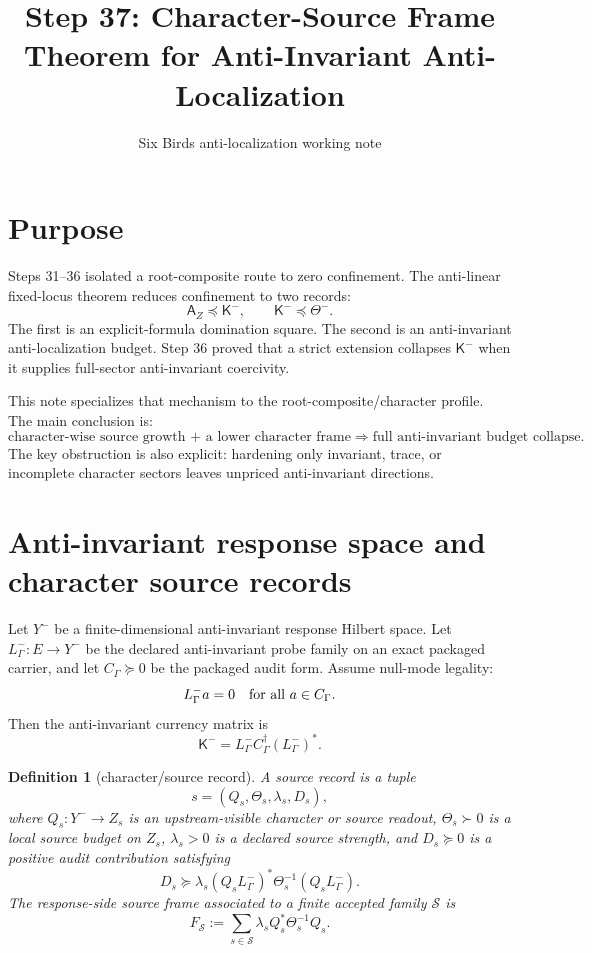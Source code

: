 \documentclass[11pt]{article}
\title{Step 37: Character-Source Frame Theorem for Anti-Invariant Anti-Localization}
\author{Six Birds anti-localization working note}
\date{}
\newtheorem{definition}{Definition}
\let\Ker\relax
\DeclareMathOperator{\Ker}{Ker}
\begin{document}
\maketitle

\section{Purpose}
Steps 31--36 isolated a root-composite route to zero confinement.  The anti-linear fixed-locus theorem reduces confinement to two records:
\[
  \mathsf A_Z\preceq \mathsf K^- ,
  \qquad
  \mathsf K^-\preceq \Theta^- .
\]
The first is an explicit-formula domination square.  The second is an anti-invariant anti-localization budget.  Step 36 proved that a strict extension collapses \(\mathsf K^-\) when it supplies full-sector anti-invariant coercivity.

This note specializes that mechanism to the root-composite/character profile.  The main conclusion is:
\[
\boxed{
\text{character-wise source growth + a lower character frame}
\Longrightarrow
\text{full anti-invariant budget collapse}.
}
\]
The key obstruction is also explicit: hardening only invariant, trace, or incomplete character sectors leaves unpriced anti-invariant directions.

\section{Anti-invariant response space and character source records}
Let \(Y^-\) be a finite-dimensional anti-invariant response Hilbert space.  Let \(L^-_\Gamma:E\to Y^-\) be the declared anti-invariant probe family on an exact packaged carrier, and let \(C_\Gamma\succeq0\) be the packaged audit form.  Assume null-mode legality:
\[
  L^-_\Gamma a=0\quad \text{for all }a\in \Ker C_\Gamma.
\]
Then the anti-invariant currency matrix is
\[
  \mathsf K^- = L^-_\Gamma C_\Gamma^\dagger (L^-_\Gamma)^* .
\]

\begin{definition}[character/source record]
A source record is a tuple
\[
  s=(Q_s,\Theta_s,\lambda_s,D_s),
\]
where \(Q_s:Y^-\to Z_s\) is an upstream-visible character or source readout, \(\Theta_s\succ0\) is a local source budget on \(Z_s\), \(\lambda_s>0\) is a declared source strength, and \(D_s\succeq0\) is a positive audit contribution satisfying
\[
  D_s\succeq
  \lambda_s (Q_sL^-_\Gamma)^*\Theta_s^{-1}(Q_sL^-_\Gamma).
\]
The response-side source frame associated to a finite accepted family \(\mathcal S\) is
\[
  F_{\mathcal S}:=
  \sum_{s\in\mathcal S}\lambda_s Q_s^*\Theta_s^{-1}Q_s.
\]
\end{definition}
\end{document}
